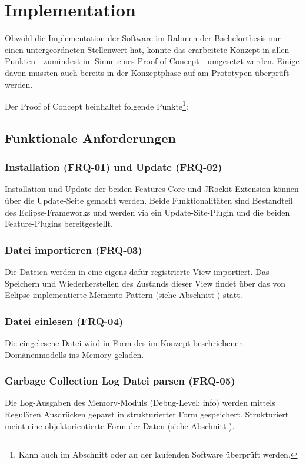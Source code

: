 \chapter{Implementation}
Obwohl die Implementation der Software im Rahmen der Bachelorthesis nur einen untergeordneten Stellenwert hat, konnte das erarbeitete Konzept in allen Punkten - zumindest im Sinne eines Proof of Concept - umgesetzt werden. Einige davon mussten auch bereits in der Konzeptphase auf am Prototypen überprüft werden.

Der Proof of Concept beinhaltet folgende Punkte\footnote{Kann auch im Abschnitt  oder an der laufenden Software überprüft werden.}:
\section{Funktionale Anforderungen}
\subsection{Installation (FRQ-01) und Update (FRQ-02)}
Installation und Update der beiden Features Core und JRockit Extension können über die Update-Seite gemacht werden. Beide Funktionalitäten sind Bestandteil des Eclipse-Frameworks und werden via ein Update-Site-Plugin und die beiden Feature-Plugins bereitgestellt.

\subsection{Datei importieren (FRQ-03)}
Die Dateien werden in eine eigens dafür registrierte View importiert. Das Speichern und Wiederherstellen des Zustands dieser View findet über das von Eclipse implementierte Memento-Pattern (siehe Abschnitt ) statt. 

\subsection{Datei einlesen (FRQ-04)}
Die eingelesene Datei wird in Form des im Konzept beschriebenen Domänenmodells ins Memory geladen. 

\subsection{Garbage Collection Log Datei parsen (FRQ-05)}
Die Log-Ausgaben des Memory-Moduls (Debug-Level: info) werden mittels Regulären Ausdrücken geparst in strukturierter Form gespeichert. Strukturiert meint eine objektorientierte Form der Daten (siehe Abschnitt ).

